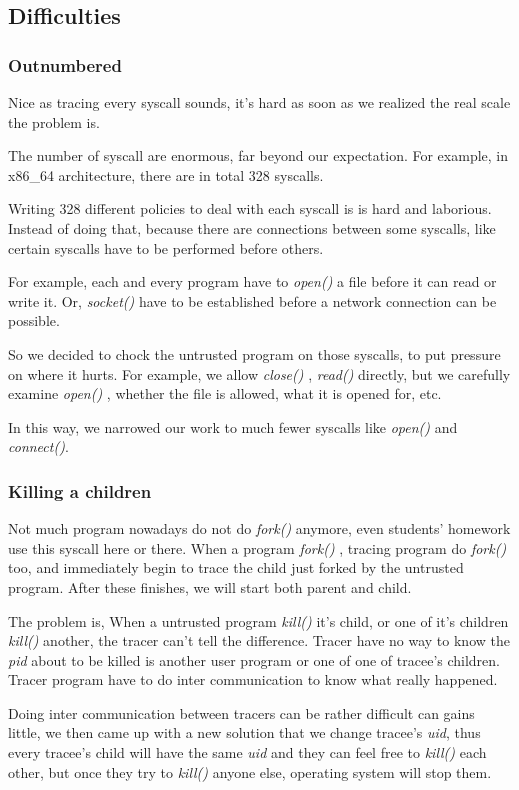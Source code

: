 \documentclass[conference,compsoc]{IEEEtran}
\begin{document}
	\subsection{Difficulties}
		\subsubsection{Outnumbered}
			\par
				Nice as tracing every syscall sounds, it's hard as soon as we realized the real scale the problem is. 
			\par 
				The number of syscall are enormous, far beyond our expectation. 
				For example, in x86\_64 architecture, there are in total 328 syscalls. 
				\par
				Writing 328 different policies to deal with each syscall is is hard and laborious. Instead of doing that, because there are connections between some syscalls, like certain syscalls have to be performed before others.
				\par
				For example, each and every program have to \emph{ open() } a file before it can read or write it. 
				Or, \emph{ socket() } have to be established before a network connection can be possible.
			\par
				So we decided to chock the untrusted program on those syscalls, to put pressure on where it hurts. 
				For example, we allow \emph{ close() }, \emph{ read() } directly, but we carefully examine \emph{ open() }, whether the file is allowed, what it is opened for, etc.
			\par 
				In this way, we narrowed our work to much fewer syscalls like \emph{open()} and \emph{connect()}.
		\subsubsection{Killing a children}
			\par 
				Not much program nowadays do not do \emph{ fork() } anymore, even students' homework use this syscall here or there. 
				When a program \emph{ fork() }, tracing program do \emph{ fork() } too, and immediately begin to trace the child just forked by the untrusted program. 
				After these finishes, we will start both parent and child.
			\par
				The problem is, When a untrusted program \emph{kill()} it's child, or one of it's children \emph{kill()} another, the tracer can't tell the difference. 
				Tracer have no way to know the \emph{pid} about to be killed is another user program or one of one of tracee's children. 
				Tracer program have to do inter communication to know what really happened.
			\par
				Doing inter communication between tracers can be rather difficult can gains little, we then came up with a new solution that we change tracee's \emph{uid}, thus every tracee's child will have the same \emph{uid} and they can feel free to \emph{kill()} each other, but once they try to \emph{kill()} anyone else, operating system will stop them.
\end{document}
